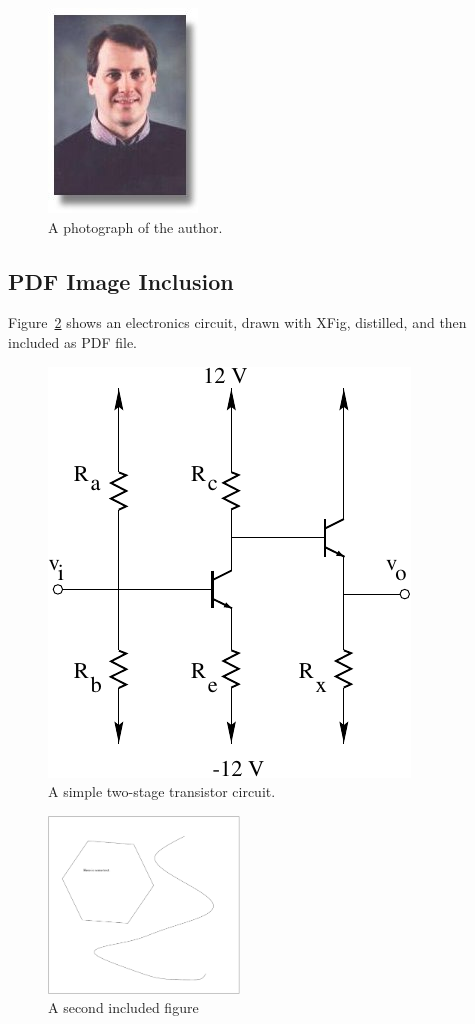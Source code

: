 \documentclass[dvipdfm]{article}
\begin{document}
\begin{figure}
  \begin{center}
    \includegraphics{mwicks.jpeg}
  \end{center}

  \caption{A photograph of the author.}
  \label{fig:author}
\end{figure}

\subsection{PDF Image Inclusion}
Figure~\ref{fig:circuit} shows
an electronics circuit,
drawn with XFig, distilled,
and then included as PDF file.
\begin{figure}
  \begin{center}
     \includegraphics{transistor}
  \end{center}

  \caption{A simple two-stage transistor circuit.}
  \label{fig:circuit}
\end{figure}

\begin{figure}
  \begin{center}
     \includegraphics[width=2.0in]{something}
  \end{center}

  \caption{A second included figure}
  \label{fig:something}
\end{figure}
\end{document}
